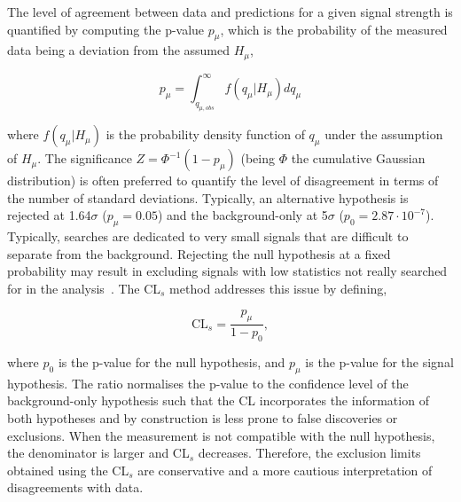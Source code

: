 The level of agreement between data and predictions for a given signal strength is quantified by computing the p-value $p_\mu$, which is the probability of the measured data being a deviation from the assumed $H_\mu$,

\begin{equation}
    p_\mu = \int_{q_{\mu,obs}}^\infty f(q_\mu|H_\mu)dq_\mu
\end{equation}

where $f(q_\mu|H_\mu)$ is the probability density function of $q_\mu$ under the assumption of $H_\mu$. The significance $Z=\Phi^{-1}(1-p_\mu)$ (being $\Phi$ the cumulative Gaussian distribution) is often preferred to quantify the level of disagreement in terms of the number of standard deviations. Typically, an alternative hypothesis is rejected at 1.64$\sigma$ ($p_\mu=0.05$) and the background-only at 5$\sigma$ ($p_0=2.87\cdot10^{-7}$).\\

Typically, searches are dedicated to very small signals that are difficult to separate from the background. Rejecting the null hypothesis at a fixed probability may result in excluding signals with low statistics not really searched for in the analysis~\cite{JUNK1999435}. The CL$_{s}$ method addresses this issue by defining,

\begin{equation}
    \text{CL}_{s}=\frac{p_\mu}{1-p_0},
\end{equation}

where $p_0$ is the p-value for the null hypothesis, and $p_\mu$ is the p-value for the signal hypothesis. The ratio normalises the p-value to the confidence level of the background-only hypothesis such that the CL incorporates the information of both hypotheses and by construction is less prone to false discoveries or exclusions. When the measurement is not compatible with the null hypothesis, the denominator is larger and CL$_{s}$ decreases. Therefore, the exclusion limits obtained using the CL$_s$ are conservative and a more cautious interpretation of disagreements with data.

